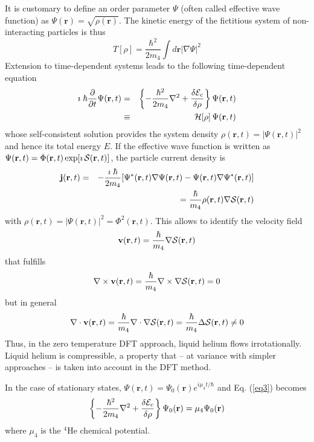 It is customary to define an order parameter $\Psi$ 
(often called effective wave function) as
$\Psi({\mathbf r}) = \sqrt{\rho ({\mathbf r})}$. The kinetic energy of the
fictitious system of non-interacting particles is thus
%
\begin{equation}
T[\rho] =
\frac{\hbar^2}{2m_4} \int d {\mathbf r} |\nabla \Psi|^2
\label{eq2}
\end{equation}
%
Extension to time-dependent systems leads to 
the following time-dependent equation
%
\begin{eqnarray}
\imath \; \hbar  {\partial \over \partial t} \Psi({\mathbf r},t)&=& \left\{ -\frac{\hbar^2}{2m_4} \nabla^2 + \frac{\delta {\cal E}_c}{\delta \rho} \right\}\Psi({\mathbf r},t) 
\nonumber
\\
& \equiv&
{\cal H}[\rho] \,\Psi({\mathbf r},t) 
\label{eq3}
\end{eqnarray}
%
whose self-consistent solution provides the system density $\rho ({\mathbf r},t)=|\Psi ({\mathbf r},t)|^2$
and hence its total energy $E$. If the effective wave function is written as
$\Psi(\mathbf{r}, t)= \Phi(\mathbf{r}, t) \exp[\imath \,{\cal S}(\mathbf{r}, t) ]$, the particle current density is
%
\begin{eqnarray}
{\mathbf j}({\mathbf r},t ) &=& - \frac{ \imath \; \hbar}{2 m_4} [\Psi^*({\mathbf r},t) \nabla \Psi({\mathbf r},t) - \Psi({\mathbf r},t) \nabla \Psi^*({\mathbf r},t)] 
\nonumber
\\
&&= \frac{  \hbar}{ m_4} \rho({\mathbf r},t)  \nabla {\cal S}({\mathbf r},t)
\end{eqnarray}
%
 with $\rho ({\mathbf r},t)=|\Psi ({\mathbf r},t)|^2 = \Phi^2({\mathbf r},t)$. This allows to identify the velocity field 
$${\mathbf v}({\mathbf r},t) =   \frac{ \hbar}{m_4} \nabla {\cal S}(\mathbf{r},t) $$ 
%
that fulfills  
%
$$\nabla  \times {\mathbf v}({\mathbf r},t)  =  \frac{ \hbar}{m_4}  \nabla \times \nabla {\cal S}(\mathbf{r},t)=0$$ 
%
but in general 
%
$$\nabla  \cdot {\mathbf v}({\mathbf r},t)  =  \frac{ \hbar}{m_4}  \nabla \cdot \nabla {\cal S}(\mathbf{r},t) = \frac{ \hbar}{m_4} \Delta {\cal S}(\mathbf{r},t) \neq 0$$ 
%
Thus, in the  zero temperature DFT approach, liquid helium flows  irrotationally.  Liquid helium  is compressible, a property that -- at variance with simpler approaches --
 is taken into account in the DFT method. 

In the case of stationary states,
$\Psi({\mathbf r},t)=\Psi_0({\mathbf r})e^{i\mu_4 t/\hbar}$ 
and Eq. (\ref{eq3})  becomes
%
\begin{equation}
\left\{-\frac{\hbar^2}{2m_4} \nabla^2 + \frac{\delta {\cal E}_c}{\delta \rho}
\right\}\Psi_0({\mathbf r}) 
= \mu_4 \Psi_0({\mathbf r})
\label{eq5}
\end{equation}
%
where $\mu_4$ is the $^4$He chemical potential. 

